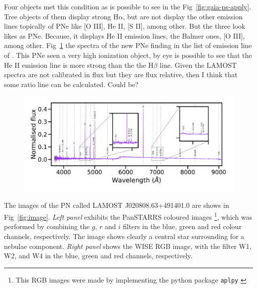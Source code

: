 \documentclass[twocolumn]{article}
\newcommand\ha{\ensuremath{\mathrm{H\alpha}}}
\begin{document}
Four objects met this  condition as is possible to see in the Fig~\ref{fig:gaia-ps-apply}.
Tree objects of them display strong \ha{}, but are not display the other emission lines topically
of PNe like [O III], He II, [S II], among other. But the three look likes as PNe.
Because, it displays He II emission lines, the Balmer ones, [O III], among other.
Fig~\ref{fig:spectra} the spectra of the new PNe finding in the list of emission line of
\citet{Skoda:2020}. This PNe seen a very high ionization object, by eye is possible to see
that the He II emission line is more strong than the the H$\beta$ line. Given the LAMOST spectra
are not calibrated in flux but they are flux relative, then I think that some ratio line can be calculated. Could be?

\begin{figure}
\centering
  \includegraphics[width=0.9\linewidth]{../Spectra-lamostdr7/spec-56581-VB031N50V1_sp08-218.pdf}
  \caption{} 
  \label{fig:spectra}
\end{figure}

The images of the PN called LAMOST J020808.63+491401.0 are shows in Fig~\ref{fig:image}.  \textit{Left panel} exhibits the PanSTARRS coloured images \footnote{This RGB images were made by implementing the python package \texttt{aplpy} \citep{aplpy:2019}}, which was performed by combining the $g$, $r$ and $i$ filters in the blue, green and red colour channels, respectively. The image shows clearly a central star surrounding for a nebulae component. \textit{Right panel} shows the WISE RGB image, with the filter W1, W2, and W4 in the blue, green and red channels, respectively.  
\end{document}
